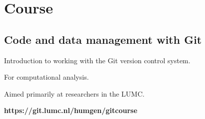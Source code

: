 \documentclass[slidestop]{beamer}
\begin{document}
\section{Course}

\subsection{Code and data management with Git}
\begin{pframe}
  Introduction to working with the Git version control system.

  \bigskip
  For computational analysis.

  \bigskip
  Aimed primarily at researchers in the LUMC.

  \bigskip
  {\bf https://git.lumc.nl/humgen/gitcourse}
\end{pframe}

\end{document}
